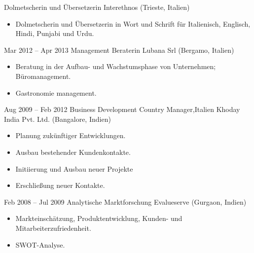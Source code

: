 \documentclass[a4paper,]{fortysecondscv}
\begin{document}
\begin{cvtable}[3]
			{Dolmetscherin und Übersetzerin}
			{Interethnos (Trieste, Italien)}
			{				
				\vspace{-\topsep}
				\begin{itemize}[nosep, leftmargin=0pt] %
					\item Dolmetscherin und Übersetzerin in Wort und Schrift für Italienisch, Englisch, Hindi, Punjabi und Urdu.
				\end{itemize}
			}
		\cvitem
			{Mar 2012 -- Apr 2013}
			{Management Beraterin}
			{Lubana Srl (Bergamo, Italien)}
			{				
				\vspace{-\topsep}
				\begin{itemize}[nosep, leftmargin=0pt] %
					\item Beratung in der Aufbau- und Wachstumsphase von Unternehmen; Büromanagement.
					\item Gastronomie management.
				\end{itemize}
			}
		\cvitem
			{Aug 2009 -- Feb 2012}
			{Business Development Country Manager,Italien}
			{Khoday India Pvt. Ltd. (Bangalore, Indien)}
			{
				\begin{itemize}[nosep, leftmargin=0pt] %
					\item Planung zukünftiger Entwicklungen.
					\item Ausbau bestehender Kundenkontakte.
					\item Initiierung und Ausbau neuer Projekte
					\item Erschließung neuer Kontakte.
				\end{itemize}
			}
		\cvitem
			{Feb 2008 -- Jul 2009}
			{Analytische Marktforschung}
			{Evalueserve (Gurgaon, Indien)}
			{
				\vspace{-\topsep}
				\begin{itemize}[nosep, leftmargin=0pt] %
					\item Markteinschätzung, Produktentwicklung, Kunden- und Mitarbeiterzufriedenheit.
					\item SWOT-Analyse.
				\end{itemize}
			}
	\end{cvtable}
\end{document}
